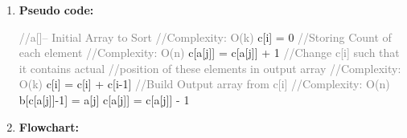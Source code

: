 \documentclass[11pt,a4paper]{article}
\begin{document}
{\begin{enumerate}[label=\textbf{\arabic*})]
					\textbf{Space complexity}
					\\[9pt]
					Counting sort requires employing an auxiliary array of size k and an array to element in order which has n value. As a result, the Counting Sort algorithm has  space complexity O(n+k). The best case, worst case and average case are the same as time complexity
				\\[12pt]
				\item \textbf{Pseudo code:} 
				\begin{algorithm}
            	\begin{algorithmic}[1]
            			\State\textcolor{Gray}{//a[]-- Initial Array to Sort}
            			\State\textcolor{Gray}{//Complexity: O(k)}
            				\State c[i] = 0
            			\EndFor
            			\vspace{12pt}
            			\State\textcolor{Gray}{//Storing Count of each element}
            			\State\textcolor{Gray}{//Complexity: O(n)}
            				\State c[a[j]] = c[a[j]] + 1
            			\EndFor
            			\vspace{12pt}
            			\State \textcolor{Gray}{//Change c[i] such that it contains actual}
            			\State \textcolor{Gray}{//position of these elements in output array}
            			\State \textcolor{Gray}{//Complexity: O(k)}
            				\State c[i] = c[i] + c[i-1]
            			\EndFor
            			\vspace{12pt}
            			\State \textcolor{Gray}{//Build Output array from c[i]}
            			\State \textcolor{Gray}{//Complexity: O(n)}
            				\State  b[c[a[j]]-1] = a[j]
            				\State c[a[j]] = c[a[j]] - 1
            			\EndFor
            		\EndProcedure
            	\end{algorithmic}
            \end{algorithm}
				\item \textbf{Flowchart:}
					\begin{figure}[H]
						\centering 

\end{figure}
\end{enumerate}}
\end{document}
